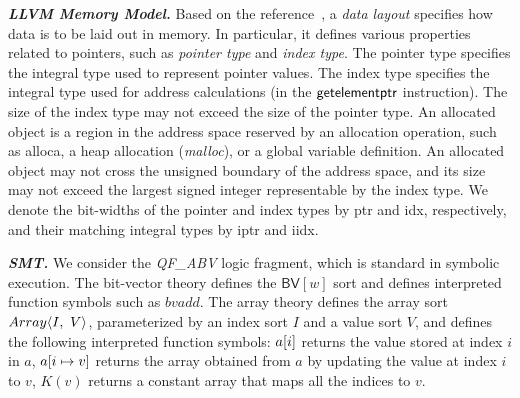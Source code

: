 \noindent \textit{\textbf{LLVM Memory Model.}}
Based on the \llvm reference~\cite{llvmref}, a \emph{data layout} specifies how data is to be laid out in memory.
In particular, it defines various properties related to pointers, such as \emph{pointer type} and \emph{index type}.
The pointer type specifies the integral type used to represent pointer values.
The index type specifies the integral type used for address calculations (\eg in the $\textsf{getelementptr}$ instruction).
The size of the index type may not exceed the size of the pointer type.
An allocated object is a region in the address space reserved by an allocation operation,
such as \textsf{alloca}, a heap allocation (\eg \textit{malloc}), or a global variable definition.
An allocated object may not cross the unsigned boundary of the address space,
and its size may not exceed the largest signed integer representable by the index type.
We denote the bit-widths of the pointer and index types by \textsf{ptr} and \textsf{idx}, respectively,
and their matching integral types by \textsf{iptr} and \textsf{iidx}.




\noindent \textit{\textbf{SMT.}}
We consider the \textit{QF\_ABV} logic fragment, which is standard in symbolic execution.
The bit-vector theory defines the $\mathsf{BV}[w]$ sort and defines interpreted function symbols such as $\textit{bvadd}$.
The array theory defines the array sort $Array\langle I,~V\rangle$, parameterized by an index sort $I$ and a value sort $V$,
and defines the following interpreted function symbols: %
$a[i]$ returns the value stored at index $i$ in $a$,
$a[i \mapsto v]$ returns the array obtained from $a$ by updating the value at index $i$ to $v$,
$K(v)$ returns a constant array that maps all the indices to $v$.

